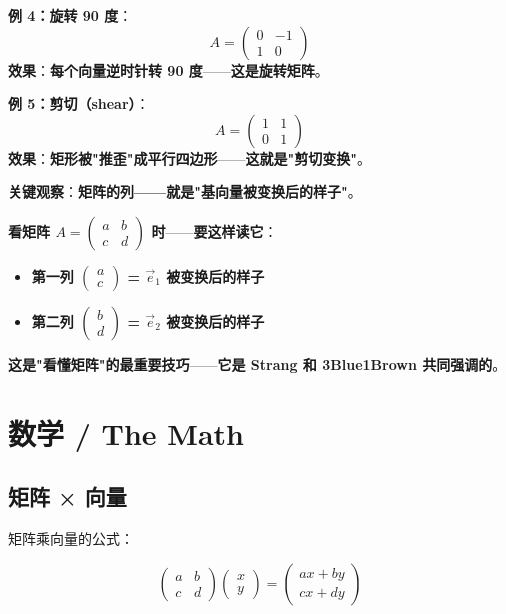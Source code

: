 \textbf{例 4：旋转 90 度}：
\[
A = \begin{pmatrix} 0 & -1 \\ 1 & 0 \end{pmatrix}
\]
\textbf{效果}：\textbf{每个向量逆时针转 90 度}——\textbf{这是旋转矩阵}。

\textbf{例 5：剪切（shear）}：
\[
A = \begin{pmatrix} 1 & 1 \\ 0 & 1 \end{pmatrix}
\]
\textbf{效果}：\textbf{矩形被"推歪"成平行四边形}——\textbf{这就是"剪切变换"}。

\textbf{关键观察}：\textbf{矩阵的列——就是"基向量被变换后的样子"}。

\textbf{看矩阵 $A = \begin{pmatrix} a & b \\ c & d \end{pmatrix}$ 时}——\textbf{要这样读它}：

\begin{itemize}
\item \textbf{第一列 $\begin{pmatrix}a\\c\end{pmatrix}$ = $\vec{e}_1$ 被变换后的样子}
\item \textbf{第二列 $\begin{pmatrix}b\\d\end{pmatrix}$ = $\vec{e}_2$ 被变换后的样子}
\end{itemize}

\textbf{这是"看懂矩阵"的最重要技巧}——\textbf{它是 Strang 和 3Blue1Brown 共同强调的}。

\section{数学 / The Math}

\subsection{矩阵 × 向量}

矩阵乘向量的公式：

\[
\begin{pmatrix} a & b \\ c & d \end{pmatrix}
\begin{pmatrix} x \\ y \end{pmatrix}
=
\begin{pmatrix} ax + by \\ cx + dy \end{pmatrix}
\]

